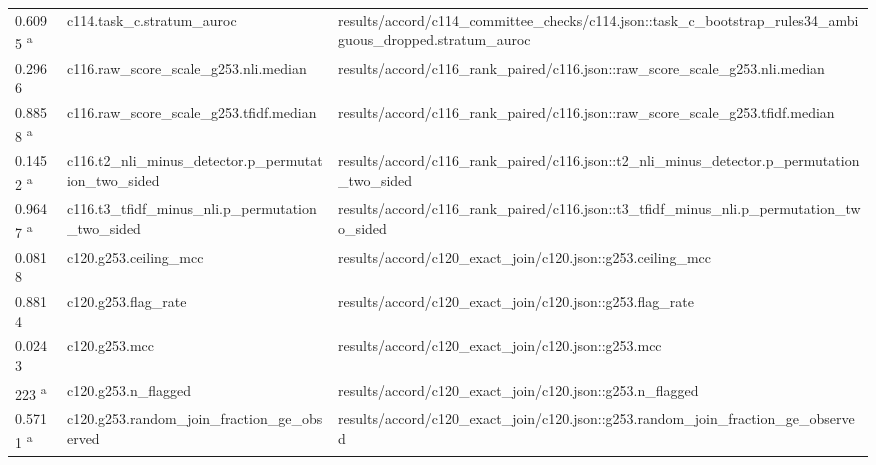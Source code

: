 \begin{longtable}{@{}p{0.7in}p{1.9in}p{2.6in}@{}}
0.6095 \textsuperscript{a} & c114.\allowbreak{}task\_c.\allowbreak{}stratum\_auroc & results/\allowbreak{}accord/\allowbreak{}c114\_committee\_checks/\allowbreak{}c114.\allowbreak{}json::task\_c\_bootstrap\_rules34\_ambiguous\_dropped.\allowbreak{}stratum\_auroc\\
0.2966 & c116.\allowbreak{}raw\_score\_scale\_g253.\allowbreak{}nli.\allowbreak{}median & results/\allowbreak{}accord/\allowbreak{}c116\_rank\_paired/\allowbreak{}c116.\allowbreak{}json::raw\_score\_scale\_g253.\allowbreak{}nli.\allowbreak{}median\\
0.8858 \textsuperscript{a} & c116.\allowbreak{}raw\_score\_scale\_g253.\allowbreak{}tfidf.\allowbreak{}median & results/\allowbreak{}accord/\allowbreak{}c116\_rank\_paired/\allowbreak{}c116.\allowbreak{}json::raw\_score\_scale\_g253.\allowbreak{}tfidf.\allowbreak{}median\\
0.1452 \textsuperscript{a} & c116.\allowbreak{}t2\_nli\_minus\_detector.\allowbreak{}p\_permutation\_two\_sided & results/\allowbreak{}accord/\allowbreak{}c116\_rank\_paired/\allowbreak{}c116.\allowbreak{}json::t2\_nli\_minus\_detector.\allowbreak{}p\_permutation\_two\_sided\\
0.9647 \textsuperscript{a} & c116.\allowbreak{}t3\_tfidf\_minus\_nli.\allowbreak{}p\_permutation\_two\_sided & results/\allowbreak{}accord/\allowbreak{}c116\_rank\_paired/\allowbreak{}c116.\allowbreak{}json::t3\_tfidf\_minus\_nli.\allowbreak{}p\_permutation\_two\_sided\\
0.0818 & c120.\allowbreak{}g253.\allowbreak{}ceiling\_mcc & results/\allowbreak{}accord/\allowbreak{}c120\_exact\_join/\allowbreak{}c120.\allowbreak{}json::g253.\allowbreak{}ceiling\_mcc\\
0.8814 & c120.\allowbreak{}g253.\allowbreak{}flag\_rate & results/\allowbreak{}accord/\allowbreak{}c120\_exact\_join/\allowbreak{}c120.\allowbreak{}json::g253.\allowbreak{}flag\_rate\\
0.0243 & c120.\allowbreak{}g253.\allowbreak{}mcc & results/\allowbreak{}accord/\allowbreak{}c120\_exact\_join/\allowbreak{}c120.\allowbreak{}json::g253.\allowbreak{}mcc\\
223 \textsuperscript{a} & c120.\allowbreak{}g253.\allowbreak{}n\_flagged & results/\allowbreak{}accord/\allowbreak{}c120\_exact\_join/\allowbreak{}c120.\allowbreak{}json::g253.\allowbreak{}n\_flagged\\
0.5711 \textsuperscript{a} & c120.\allowbreak{}g253.\allowbreak{}random\_join\_fraction\_ge\_observed & results/\allowbreak{}accord/\allowbreak{}c120\_exact\_join/\allowbreak{}c120.\allowbreak{}json::g253.\allowbreak{}random\_join\_fraction\_ge\_observed\\

\end{longtable}
